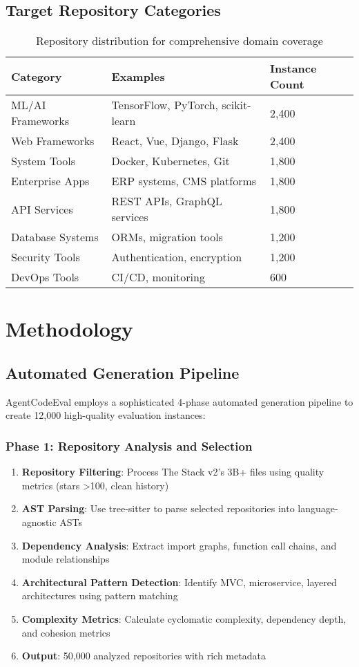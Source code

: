 \documentclass{article}
\begin{document}
\subsection{Target Repository Categories}
\begin{table}[h]
\centering
\begin{tabular}{@{}lll@{}}
\toprule
Category & Examples & Instance Count \\
\midrule
ML/AI Frameworks & TensorFlow, PyTorch, scikit-learn & 2,400 \\
Web Frameworks & React, Vue, Django, Flask & 2,400 \\
System Tools & Docker, Kubernetes, Git & 1,800 \\
Enterprise Apps & ERP systems, CMS platforms & 1,800 \\
API Services & REST APIs, GraphQL services & 1,800 \\
Database Systems & ORMs, migration tools & 1,200 \\
Security Tools & Authentication, encryption & 1,200 \\
DevOps Tools & CI/CD, monitoring & 600 \\
\bottomrule
\end{tabular}
\caption{Repository distribution for comprehensive domain coverage}
\end{table}

\section{Methodology}

\subsection{Automated Generation Pipeline}

AgentCodeEval employs a sophisticated 4-phase automated generation pipeline to create 12,000 high-quality evaluation instances:

\subsubsection{Phase 1: Repository Analysis and Selection}
\begin{enumerate}
    \item \textbf{Repository Filtering}: Process The Stack v2's 3B+ files using quality metrics (stars >100, clean history)
    \item \textbf{AST Parsing}: Use tree-sitter to parse selected repositories into language-agnostic ASTs
    \item \textbf{Dependency Analysis}: Extract import graphs, function call chains, and module relationships
    \item \textbf{Architectural Pattern Detection}: Identify MVC, microservice, layered architectures using pattern matching
    \item \textbf{Complexity Metrics}: Calculate cyclomatic complexity, dependency depth, and cohesion metrics
    \item \textbf{Output}: 50,000 analyzed repositories with rich metadata
\end{enumerate}
\end{document}
